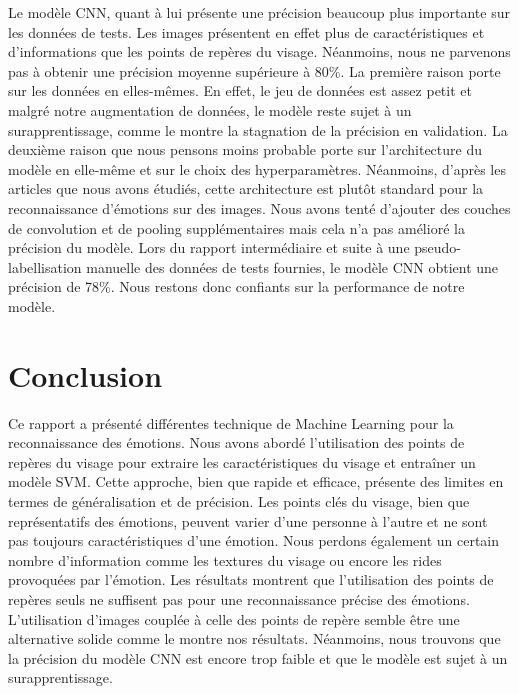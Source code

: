 \documentclass{rapport}
\begin{document}
Le modèle CNN, quant à lui présente une précision beaucoup plus importante sur les données de tests. Les images présentent en effet plus de caractéristiques
et d'informations que les points de repères du visage. Néanmoins, nous ne parvenons pas à obtenir une précision moyenne supérieure à 80\%. La première raison
porte sur les données en elles-mêmes. En effet, le jeu de données est assez petit et malgré notre augmentation de données, le modèle reste sujet à un surapprentissage,
comme le montre la stagnation de la précision en validation. La deuxième raison que nous pensons moins probable porte sur l'architecture du modèle en elle-même et sur le choix
des hyperparamètres. Néanmoins, d'après les articles que nous avons étudiés, cette architecture est plutôt standard pour la reconnaissance d'émotions sur des images.
Nous avons tenté d'ajouter des couches de convolution et de pooling supplémentaires mais cela n'a pas amélioré la précision du modèle.
Lors du rapport intermédiaire et suite à une pseudo-labellisation manuelle des données de tests fournies, le modèle CNN obtient une précision de 78\%.
Nous restons donc confiants sur la performance de notre modèle.


\section{Conclusion}
Ce rapport a présenté différentes technique de Machine Learning pour la reconnaissance des émotions.
Nous avons abordé l'utilisation des points de repères du visage pour extraire les caractéristiques du visage et entraîner un modèle SVM.
Cette approche, bien que rapide et efficace, présente des limites en termes de généralisation et de précision. Les points clés du visage,
bien que représentatifs des émotions, peuvent varier d'une personne à l'autre et ne sont pas toujours caractéristiques d'une émotion.
Nous perdons également un certain nombre d'information comme les textures du visage ou encore les rides provoquées par l'émotion.
Les résultats montrent que l'utilisation des points de repères seuls ne suffisent pas pour une reconnaissance précise des émotions.
L'utilisation d'images couplée à celle des points de repère semble être une alternative solide comme le montre nos résultats. Néanmoins, nous
trouvons que la précision du modèle CNN est encore trop faible et que le modèle est sujet à un surapprentissage.




\end{document}
